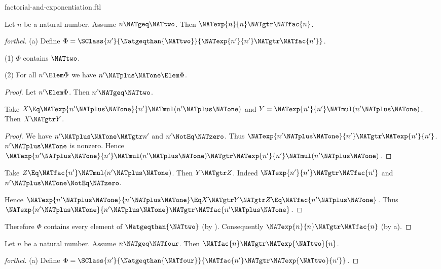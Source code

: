 \documentclass{stex}
\begin{document}
\begin{smodule}{factorial-and-exponentiation.ftl}

\begin{proposition}[forthel]
  Let $n$ be a natural number.
  Assume $n \NATgeq \NATtwo$.
  Then $\NATexp{n}{n} \NATgtr \NATfac{n}$.
\end{proposition}
\begin{proof}[forthel]
  (a) Define $\Phi = \SClass{n'}{\Natgeqthan{\NATtwo}}{\NATexp{n'}{n'} \NATgtr \NATfac{n'}}$.

  (1) $\Phi$ contains $\NATtwo$.

  (2) For all $n' \Elem \Phi$ we have $n' \NATplus \NATone \Elem \Phi$.
  \begin{proof}
    Let $n' \Elem \Phi$.
    Then $n' \NATgeq \NATtwo$.

    Take $X \Eq \NATexp{n' \NATplus \NATone}{n'} \NATmul (n' \NATplus \NATone)$ and $Y = \NATexp{n'}{n'} \NATmul (n' \NATplus \NATone)$.
    Then $X \NATgtr Y$.
    \begin{proof}
      We have $n' \NATplus \NATone \NATgtr n'$ and $n' \NotEq \NATzero$.
      Thus $\NATexp{n' \NATplus \NATone}{n'} \NATgtr \NATexp{n'}{n'}$.
      $n' \NATplus \NATone$ is nonzero.
      Hence $\NATexp{n' \NATplus \NATone}{n'} \NATmul (n' \NATplus \NATone) \NATgtr \NATexp{n'}{n'} \NATmul (n' \NATplus \NATone)$.
    \end{proof}

    Take $Z \Eq \NATfac{n'} \NATmul (n' \NATplus \NATone)$.
    Then $Y \NATgtr Z$.
    Indeed $\NATexp{n'}{n'} \NATgtr \NATfac{n'}$ and $n' \NATplus \NATone \NotEq \NATzero$.

    Hence $\NATexp{n' \NATplus \NATone}{n' \NATplus \NATone} \Eq X \NATgtr Y \NATgtr Z \Eq \NATfac{n' \NATplus \NATone}$.
    Thus $\NATexp{n' \NATplus \NATone}{n' \NATplus \NATone} \NATgtr \NATfac{n' \NATplus \NATone}$.
  \end{proof}

  Therefore $\Phi$ contains every element of $\Natgeqthan{\NATtwo}$ (by ).
  Consequently $\NATexp{n}{n} \NATgtr \NATfac{n}$ (by a).
\end{proof}

\begin{proposition}[forthel]
  Let $n$ be a natural number.
  Assume $n \NATgeq \NATfour$.
  Then $\NATfac{n} \NATgtr \NATexp{\NATtwo}{n}$.
\end{proposition}
\begin{proof}[forthel]
  (a) Define $\Phi = \SClass{n'}{\Natgeqthan{\NATfour}}{\NATfac{n'} \NATgtr \NATexp{\NATtwo}{n'}}$.


\end{proof}
\end{smodule}
\end{document}
